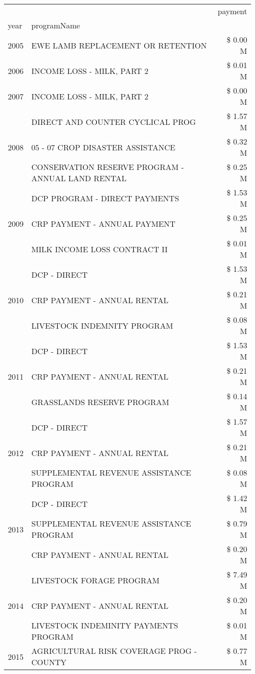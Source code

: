 \begin{tabular}{llr}
\toprule
 &  & payment \\
year & programName &  \\
\midrule
2005 & EWE LAMB REPLACEMENT OR RETENTION & \$ 0.00 M \\
\cline{1-3}
2006 & INCOME LOSS - MILK, PART 2 & \$ 0.01 M \\
\cline{1-3}
2007 & INCOME LOSS - MILK, PART 2 & \$ 0.00 M \\
\cline{1-3}
\multirow[t]{3}{*}{2008} & DIRECT AND COUNTER CYCLICAL PROG & \$ 1.57 M \\
 & 05 - 07 CROP DISASTER ASSISTANCE & \$ 0.32 M \\
 & CONSERVATION RESERVE PROGRAM - ANNUAL LAND RENTAL & \$ 0.25 M \\
\cline{1-3}
\multirow[t]{3}{*}{2009} & DCP PROGRAM - DIRECT PAYMENTS & \$ 1.53 M \\
 & CRP PAYMENT - ANNUAL PAYMENT & \$ 0.25 M \\
 & MILK INCOME LOSS CONTRACT II & \$ 0.01 M \\
\cline{1-3}
\multirow[t]{3}{*}{2010} & DCP - DIRECT & \$ 1.53 M \\
 & CRP PAYMENT - ANNUAL RENTAL & \$ 0.21 M \\
 & LIVESTOCK INDEMNITY PROGRAM & \$ 0.08 M \\
\cline{1-3}
\multirow[t]{3}{*}{2011} & DCP - DIRECT & \$ 1.53 M \\
 & CRP PAYMENT - ANNUAL RENTAL & \$ 0.21 M \\
 & GRASSLANDS RESERVE PROGRAM & \$ 0.14 M \\
\cline{1-3}
\multirow[t]{3}{*}{2012} & DCP - DIRECT & \$ 1.57 M \\
 & CRP PAYMENT - ANNUAL RENTAL & \$ 0.21 M \\
 & SUPPLEMENTAL REVENUE ASSISTANCE PROGRAM & \$ 0.08 M \\
\cline{1-3}
\multirow[t]{3}{*}{2013} & DCP - DIRECT & \$ 1.42 M \\
 & SUPPLEMENTAL REVENUE ASSISTANCE PROGRAM & \$ 0.79 M \\
 & CRP PAYMENT - ANNUAL RENTAL & \$ 0.20 M \\
\cline{1-3}
\multirow[t]{3}{*}{2014} & LIVESTOCK FORAGE PROGRAM & \$ 7.49 M \\
 & CRP PAYMENT - ANNUAL RENTAL & \$ 0.20 M \\
 & LIVESTOCK INDEMINITY PAYMENTS PROGRAM & \$ 0.01 M \\
\cline{1-3}
\multirow[t]{3}{*}{2015} & AGRICULTURAL RISK COVERAGE PROG - COUNTY & \$ 0.77 M \\

\end{tabular}
